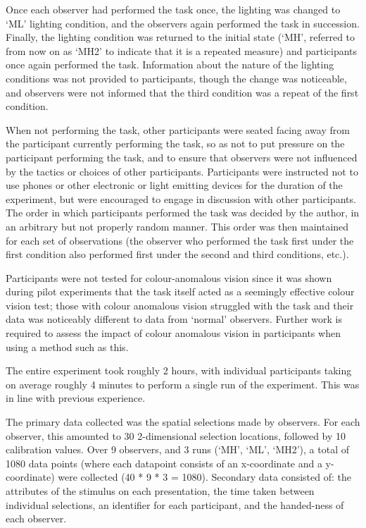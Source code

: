Once each observer had performed the task once, the lighting was changed to `ML' lighting condition, and the observers again performed the task in succession. Finally, the lighting condition was returned to the initial state (`MH', referred to from now on as `MH2' to indicate that it is a repeated measure) and participants once again performed the task. Information about the nature of the lighting conditions was not provided to participants, though the change was noticeable, and observers were not informed that the third condition was a repeat of the first condition. 

When not performing the task, other participants were seated facing away from the participant currently performing the task, so as not to put pressure on the participant performing the task, and to ensure that observers were not influenced by the tactics or choices of other participants. Participants were instructed not to use phones or other electronic or light emitting devices for the duration of the experiment, but were encouraged to engage in discussion with other participants. The order in which participants performed the task was decided by the author, in an arbitrary but not properly random manner. This order was then maintained for each set of observations (the observer who performed the task first under the first condition also performed first under the second and third conditions, etc.).

Participants were not tested for colour-anomalous vision since it was shown during pilot experiments that the task itself acted as a seemingly effective colour vision test; those with colour anomalous vision struggled with the task and their data was noticeably different to data from `normal' observers. Further work is required to assess the impact of colour anomalous vision in participants when using a method such as this. 

The entire experiment took roughly 2 hours, with individual participants taking on average roughly 4 minutes to perform a single run of the experiment. This was in line with previous experience.

The primary data collected was the spatial selections made by observers. For each observer, this amounted to 30 2-dimensional selection locations, followed by 10 calibration values. Over 9 observers, and 3 runs (`MH', `ML', `MH2'), a total of 1080 data points (where each datapoint consists of an x-coordinate and a y-coordinate) were collected (40 * 9 * 3 = 1080). Secondary data consisted of: the attributes of the stimulus on each presentation, the time taken between individual selections, an identifier for each participant, and the handed-ness of each observer.

